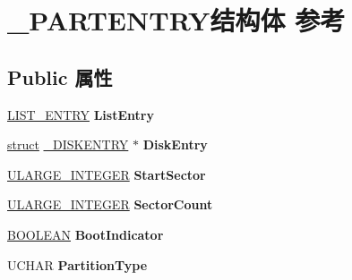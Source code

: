 \hypertarget{struct___p_a_r_t_e_n_t_r_y}{}\section{\+\_\+\+P\+A\+R\+T\+E\+N\+T\+R\+Y结构体 参考}
\label{struct___p_a_r_t_e_n_t_r_y}
\subsection*{Public 属性}
\begin{DoxyCompactItemize}
\item 
\mbox{\label{struct___p_a_r_t_e_n_t_r_y_acad2f149dc91b45ef459041f49a893cc}} 
\hyperlink{struct___l_i_s_t___e_n_t_r_y}{L\+I\+S\+T\+\_\+\+E\+N\+T\+RY} {\bfseries List\+Entry}
\item 
\mbox{\label{struct___p_a_r_t_e_n_t_r_y_a7b46d5cad8a322b95ad8abbee89374ad}} 
\hyperlink{interfacestruct}{struct} \hyperlink{struct___d_i_s_k_e_n_t_r_y}{\+\_\+\+D\+I\+S\+K\+E\+N\+T\+RY} $\ast$ {\bfseries Disk\+Entry}
\item 
\mbox{\label{struct___p_a_r_t_e_n_t_r_y_ad55e98ac9367417850b500bd0ca4e65a}} 
\hyperlink{struct___u_l_a_r_g_e___i_n_t_e_g_e_r}{U\+L\+A\+R\+G\+E\+\_\+\+I\+N\+T\+E\+G\+ER} {\bfseries Start\+Sector}
\item 
\mbox{\label{struct___p_a_r_t_e_n_t_r_y_a5311ebf0016703072ec0ab7e5a8df981}} 
\hyperlink{struct___u_l_a_r_g_e___i_n_t_e_g_e_r}{U\+L\+A\+R\+G\+E\+\_\+\+I\+N\+T\+E\+G\+ER} {\bfseries Sector\+Count}
\item 
\mbox{\label{struct___p_a_r_t_e_n_t_r_y_a5dcf2cf62742f59982cdf0a900836cc6}} 
\hyperlink{_processor_bind_8h_a112e3146cb38b6ee95e64d85842e380a}{B\+O\+O\+L\+E\+AN} {\bfseries Boot\+Indicator}
\item 
\mbox{\label{struct___p_a_r_t_e_n_t_r_y_a33fe3aaa6100378db4f5a4f8eda5a5e3}} 
U\+C\+H\+AR {\bfseries Partition\+Type}
\item 
\mbox{\label{struct___p_a_r_t_e_n_t_r_y_a3d88ceb0a90dc0861950c9c072bfc5ec}} 

\end{DoxyCompactItemize}
